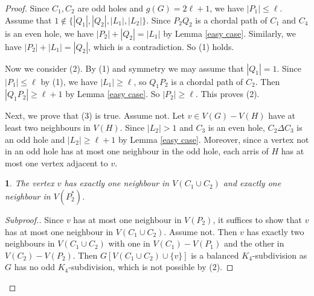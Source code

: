 \documentclass[11pt]{article}
\newtheorem{claim}{}[theorem]
\begin{document}
\begin{proof}
Since $C_1, C_2$ are odd holes and $g(G)=2\ell+1$, we have $|P_1|\leq\ell$.
Assume that $1\notin \{|Q_1|, |Q_2|, |L_1|, |L_2|\}$. Since $P_2Q_2$ is a chordal path of $C_1$ and $C_4$ is an even hole, we have $|P_2|+|Q_2|=|L_1|$ by Lemma \ref{easy case}. Similarly, we have $|P_2|+|L_1|=|Q_2|$, which is a contradiction. So (1) holds.

Now we consider (2). By (1) and symmetry we may assume that $|Q_1|=1$. Since $|P_1|\leq\ell$ by (1), we have  $|L_1|\geq\ell$, so $Q_1P_2$ is a chordal path of $C_2$. Then $|Q_1P_2|\geq\ell+1$ by Lemma \ref{easy case}. So $|P_2|\geq\ell$. This proves (2).

Next, we prove that (3) is true. Assume not. Let $v\in V(G)-V(H)$ have at least two neighbours in $V(H)$. Since $|L_2|>1$ and $C_3$ is an even hole, $C_2\Delta C_3$ is an odd hole and $|L_2|\geq\ell+1$ by Lemma \ref{easy case}. Moreover, since a vertex not in an odd hole has at most one neighbour in the odd hole, each arris of $H$ has at most one vertex adjacent to $v$.

\begin{claim}\label{2neighbour}
The vertex $v$ has exactly one neighbour in $V(C_1\cup C_2)$ and exactly one neighbour in $V(P^*_2)$.
\end{claim}
\begin{proof}[Subproof.]
Since $v$ has at most one neighbour in $V(P_2)$, it suffices to show that $v$ has at most one neighbour in $V(C_1\cup C_2)$. Assume not. Then $v$ has exactly two neighbours in $V(C_1\cup C_2)$ with one in $V(C_1)-V(P_1)$ and the other in $V(C_2)-V(P_2)$. Then $G[V(C_1\cup C_2)\cup\{v\}]$ is a balanced $K_4$-subdivision as $G$ has no odd $K_4$-subdivision,  which is not possible by (2).
\end{proof}


\end{proof}
\end{document}
